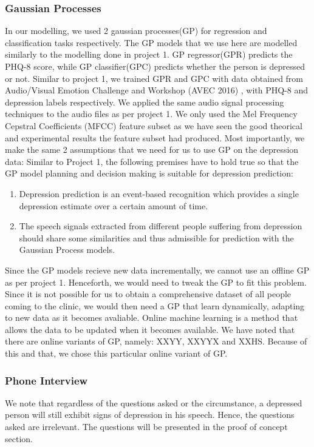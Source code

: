 \documentclass{article}
\begin{document}
	\subsubsection{Gaussian Processes} 
In our modelling, we used 2 gaussian processes(GP) for regression and classification tasks respectively. The GP models that we use here are modelled similarly to the modelling done in project 1. GP regressor(GPR) predicts the PHQ-8 score, while GP classifier(GPC) predicts whether the person is depressed or not. Similar to project 1, we trained GPR and GPC with data obtained from Audio/Visual Emotion Challenge and Workshop (AVEC 2016) \cite{avec2016}, with PHQ-8 and depression labels respectively. We applied the same audio signal processing techniques to the audio files as per project 1. We only used the Mel Frequency Cepstral Coefficients (MFCC) feature subset as we have seen the good theorical and experimental results the feature subset had produced. Most importantly, we make the same 2 assumptions that we need for us to use GP on the depression data: 
	Similar to Project 1, the following premises have to hold true so that the GP model planning and decision making is suitable for depression prediction:
	\begin{enumerate}
		\item Depression prediction is an event-based recognition which provides a single depression estimate over a certain amount of time. \cite{Valstar2016}
		\item The speech signals extracted from different people suffering from depression should share some similarities and thus admissible for prediction with the Gaussian Process models\cite{Cummins2015}.
	\end{enumerate}
Since the GP models recieve new data incrementally, we cannot use an offline GP as per project 1. Henceforth, we would need to tweak the GP to fit this problem. Since it is not possible for us to obtain a comprehensive dataset of all people coming to the clinic, we would then need a GP that learn dynamically, adapting to new data as it becomes avaliable. Online machine learning is a method that allows the data to be updated when it becomes available. We have noted that there are online variants of GP, namely: XXYY, XXYYX and XXHS. Because of this and that, we chose this particular online variant of GP. 
	
	\subsubsection{Phone Interview}
	We note that regardless of the questions asked or the circumstance, a depressed person will still exhibit signs of depression in his speech\cite{jad2008}. Hence, the questions asked are irrelevant. The questions will be presented in the proof of concept section.
\end{document}
